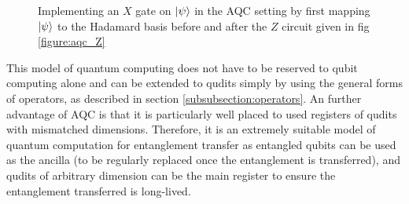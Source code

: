 \begin{figure}[h]
    \begin{center}
    \caption{Implementing an $X$ gate on $\ket{\psi}$ in the AQC setting by first mapping $\ket{\psi}$ to the Hadamard basis before and after the $Z$ circuit given in fig \ref{figure:aqc_Z}}
    \label{figure:aqc_X}
    \end{center}
\end{figure}
This model of quantum computing does not have to be reserved to qubit computing alone and can be extended to qudits simply by using the general forms of operators, as described in section \ref{subsubsection:operators}.
An further advantage of AQC is that it is particularly well placed to used registers of qudits with mismatched dimensions.
Therefore, it is an extremely suitable model of quantum computation for entanglement transfer as entangled qubits can be used as the ancilla (to be regularly replaced once the entanglement is transferred), and qudits of arbitrary dimension can be the main register to ensure the entanglement transferred is long-lived.
